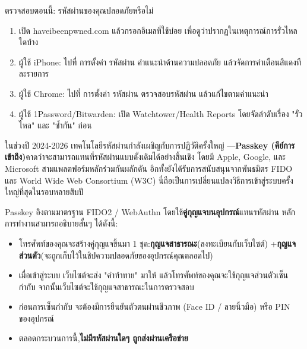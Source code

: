 \begin{tcbpractice}{ตรวจสอบตอนนี้: รหัสผ่านของคุณปลอดภัยหรือไม่}
\begin{enumerate}
  \item เปิด haveibeenpwned.com แล้วกรอกอีเมลที่ใช้บ่อย เพื่อดูว่าปรากฏในเหตุการณ์การรั่วไหลใดบ้าง
  \item ผู้ใช้ iPhone: ไปที่ การตั้งค่า รหัสผ่าน คำแนะนำด้านความปลอดภัย แล้วจัดการคำเตือนสีแดงทีละรายการ
  \item ผู้ใช้ Chrome: ไปที่ การตั้งค่า รหัสผ่าน ตรวจสอบรหัสผ่าน แล้วแก้ไขตามคำแนะนำ
  \item ผู้ใช้ 1Password/Bitwarden: เปิด Watchtower/Health Reports โดยจัดลำดับเรื่อง "รั่วไหล" และ "ซ้ำกัน" ก่อน
\end{enumerate}

\end{tcbpractice}


ในช่วงปี 2024-2026 เทคโนโลยีรหัสผ่านกำลังเผชิญกับการปฏิวัติครั้งใหญ่ —\textbf{Passkey (คีย์การเข้าถึง)}คาดว่าจะสามารถแทนที่รหัสผ่านแบบดั้งเดิมได้อย่างสิ้นเชิง โดยมี Apple, Google, และ Microsoft สามแพลตฟอร์มหลักร่วมกันผลักดัน อีกทั้งยังได้รับการสนับสนุนจากพันธมิตร FIDO และ World Wide Web Consortium (W3C) นี่ถือเป็นการเปลี่ยนแปลงวิธีการเข้าสู่ระบบครั้งใหญ่ที่สุดในรอบหลายสิบปี


Passkey อิงตามมาตรฐาน FIDO2 / WebAuthn โดยใช้\textbf{คู่กุญแจบนอุปกรณ์}แทนรหัสผ่าน หลักการทำงานสามารถอธิบายสั้นๆ ได้ดังนี้:

\begin{itemize}
  \item โทรศัพท์ของคุณจะสร้างคู่กุญแจขึ้นมา 1 ชุด:\textbf{กุญแจสาธารณะ}(ลงทะเบียนกับเว็บไซต์) +\textbf{กุญแจส่วนตัว}(จะถูกเก็บไว้ในชิปความปลอดภัยของอุปกรณ์คุณตลอดไป)
  \item เมื่อเข้าสู่ระบบ เว็บไซต์จะส่ง "คำท้าทาย" มาให้ แล้วโทรศัพท์ของคุณจะใช้กุญแจส่วนตัวเซ็นกำกับ จากนั้นเว็บไซต์จะใช้กุญแจสาธารณะในการตรวจสอบ
  \item ก่อนการเซ็นกำกับ จะต้องมีการยืนยันตัวตนผ่านชีวภาพ (Face ID / ลายนิ้วมือ) หรือ PIN ของอุปกรณ์
  \item ตลอดกระบวนการนี้,\textbf{ไม่มีรหัสผ่านใดๆ ถูกส่งผ่านเครือข่าย}
\end{itemize}


